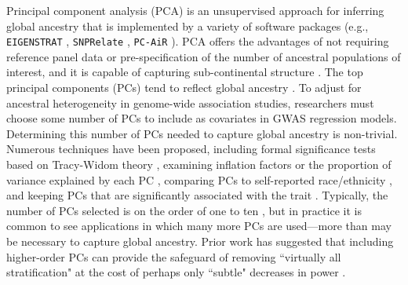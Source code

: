\documentclass[12pt]{article}
\begin{document}
Principal component analysis (PCA) is an unsupervised approach for inferring global ancestry that is implemented by a variety of software packages (e.g., \texttt{EIGENSTRAT} \citep{eigenstrat}, \texttt{SNPRelate} \citep{snprelate}, \texttt{PC-AiR} \citep{conomos2015}). 
PCA offers the advantages of not requiring reference panel data or pre-specification of the number of ancestral populations of interest, and it is capable of capturing sub-continental structure \citep{novembre2008}. 
The top principal components (PCs) %
tend to reflect global ancestry \citep{patterson2006, mcvean2009}.
To adjust for ancestral heterogeneity in genome-wide association studies, researchers must choose some number of PCs %
to include as covariates in GWAS regression models. 
Determining this number of PCs needed to capture global ancestry is non-trivial. 
Numerous techniques have been proposed, including formal significance tests based on Tracy-Widom theory \citep{eigenstrat, patterson2006}, examining inflation factors \citep{conomos2016, reed2015} or the proportion of variance explained by each PC \citep{conomos2016, reed2015, raska2012}, comparing PCs to self-reported race/ethnicity \citep{conomos2016}, and keeping PCs that are significantly associated with the trait \citep{reiner2012, daya2019}.
Typically, the number of PCs selected is on the order of one to ten \citep{abegaz2019}, but in practice it is common to see applications in which many more PCs are used---more than may be necessary to capture global ancestry. 
Prior work has suggested that including higher-order PCs can provide the safeguard of removing ``virtually all stratification" \citep{mathieson2012} at the cost of perhaps only ``subtle" decreases in power \citep{liu2011}.
\end{document}
